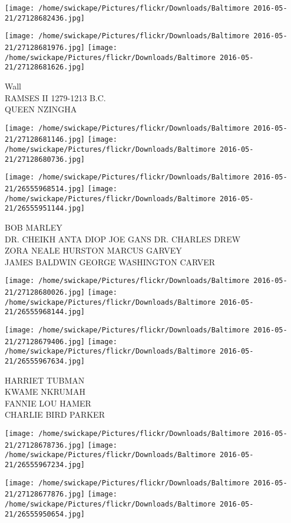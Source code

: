 \documentclass[10pt,letterpaper]{article}
\begin{document}
\texttt{[image: /home/swickape/Pictures/flickr/Downloads/Baltimore 2016-05-21/27128682436.jpg]}

\vspace{0.25in}
\texttt{[image: /home/swickape/Pictures/flickr/Downloads/Baltimore 2016-05-21/27128681976.jpg]}
\texttt{[image: /home/swickape/Pictures/flickr/Downloads/Baltimore 2016-05-21/27128681626.jpg]}

Wall\\
RAMSES II 1279{-}1213 B.C.\\
QUEEN NZINGHA
\pagebreak

\texttt{[image: /home/swickape/Pictures/flickr/Downloads/Baltimore 2016-05-21/27128681146.jpg]}
\texttt{[image: /home/swickape/Pictures/flickr/Downloads/Baltimore 2016-05-21/27128680736.jpg]}

\texttt{[image: /home/swickape/Pictures/flickr/Downloads/Baltimore 2016-05-21/26555968514.jpg]}
\texttt{[image: /home/swickape/Pictures/flickr/Downloads/Baltimore 2016-05-21/26555951144.jpg]}

BOB MARLEY\\
DR. CHEIKH ANTA DIOP JOE GANS DR. CHARLES DREW\\
ZORA NEALE HURSTON MARCUS GARVEY\\
JAMES BALDWIN GEORGE WASHINGTON CARVER
\pagebreak

\texttt{[image: /home/swickape/Pictures/flickr/Downloads/Baltimore 2016-05-21/27128680026.jpg]}
\texttt{[image: /home/swickape/Pictures/flickr/Downloads/Baltimore 2016-05-21/26555968144.jpg]}

\texttt{[image: /home/swickape/Pictures/flickr/Downloads/Baltimore 2016-05-21/27128679406.jpg]}
\texttt{[image: /home/swickape/Pictures/flickr/Downloads/Baltimore 2016-05-21/26555967634.jpg]}

HARRIET TUBMAN\\
KWAME NKRUMAH\\
FANNIE LOU HAMER\\
CHARLIE BIRD PARKER
\pagebreak

\texttt{[image: /home/swickape/Pictures/flickr/Downloads/Baltimore 2016-05-21/27128678736.jpg]}
\texttt{[image: /home/swickape/Pictures/flickr/Downloads/Baltimore 2016-05-21/26555967234.jpg]}

\texttt{[image: /home/swickape/Pictures/flickr/Downloads/Baltimore 2016-05-21/27128677876.jpg]}
\texttt{[image: /home/swickape/Pictures/flickr/Downloads/Baltimore 2016-05-21/26555950654.jpg]}
\end{document}
